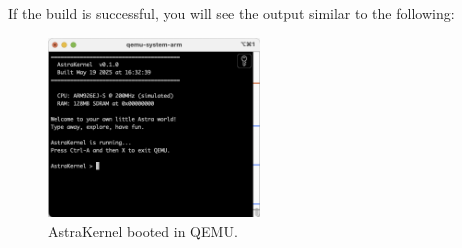\noindent
If the build is successful, you will see the output similar to the following:

\begin{figure}[H]
  \centering
  \includegraphics[width=0.5\textwidth]{figures/bootedKernel.png}
  \caption{AstraKernel booted in QEMU.}
  \label{fig:bootedKernel}
\end{figure}
